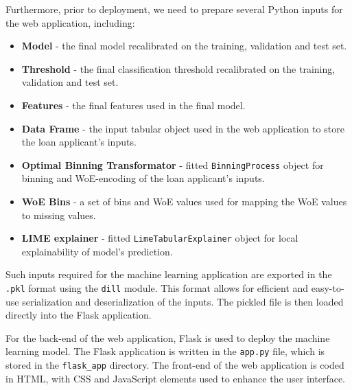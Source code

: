 Furthermore, prior to deployment, we need to prepare several Python inputs for the web application, including:
\begin{itemize}\setlength\itemsep{0em}
\item \textbf{Model} - the final model recalibrated on the training, validation and test set.
\item \textbf{Threshold} - the final classification threshold recalibrated on the training, validation and test set.
\item \textbf{Features} - the final features used in the final model.
\item \textbf{Data Frame} - the input tabular object used in the web application to store the loan applicant's inputs.
\item \textbf{Optimal Binning Transformator} - fitted \lstinline{BinningProcess} object for binning and WoE-encoding of the loan applicant's inputs.
\item \textbf{WoE Bins} - a set of bins and WoE values used for mapping the WoE values to missing values.
\item \textbf{LIME explainer} - fitted \lstinline{LimeTabularExplainer} object for local explainability of model's prediction.
\end{itemize}

Such inputs required for the machine learning application are exported in the \lstinline{.pkl} format using the \lstinline{dill} module. This format allows for efficient and easy-to-use serialization and deserialization of the inputs. The pickled file is then loaded directly into the Flask application.

For the back-end of the web application, Flask is used to deploy the machine learning model. The Flask application is written in the \lstinline{app.py} file, which is stored in the \lstinline{flask_app} directory. The front-end of the web application is coded in HTML, with CSS and JavaScript elements used to enhance the user interface.

